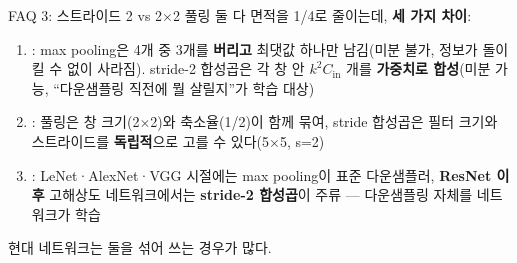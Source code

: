 \begin{frame}{FAQ 3: 스트라이드 2 vs 2$\times$2 풀링}
  둘 다 면적을 1/4로 줄이는데, \textbf{세 가지 차이}:
  \begin{enumerate}
    \item {}: max pooling은 4개 중 3개를 \textbf{버리고}
      최댓값 하나만 남김(미분 불가, 정보가 돌이킬 수 없이 사라짐).
      stride-2 합성곱은 각 창 안 $k^2C_{\text{in}}$ 개를
      \textbf{가중치로 합성}(미분 가능, ``다운샘플링 직전에 뭘
      살릴지''가 학습 대상)
    \item {}: 풀링은 창 크기(2$\times$2)와 축소율(1/2)이
      함께 묶여, stride 합성곱은 필터 크기와 스트라이드를
      \textbf{독립적}으로 고를 수 있다(5$\times$5, s=2)
    \item {}: LeNet·AlexNet·VGG 시절에는 max pooling이 표준
      다운샘플러, \textbf{ResNet 이후} 고해상도 네트워크에서는
      \textbf{stride-2 합성곱}이 주류 --- 다운샘플링 자체를
      네트워크가 학습
  \end{enumerate}
  {\footnotesize 현대 네트워크는 둘을 섞어 쓰는 경우가 많다.}
\end{frame}
